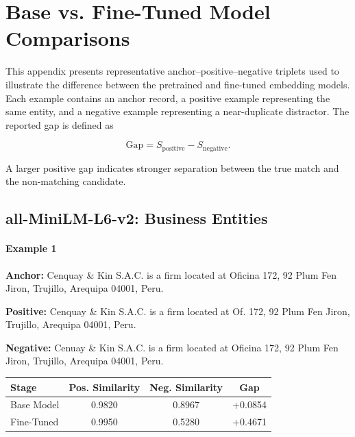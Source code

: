 \documentclass{article}
\begin{document}

\section{Base vs. Fine-Tuned Model Comparisons}
\label{sec:appendix-comparisons}

This appendix presents representative anchor--positive--negative triplets
used to illustrate the difference between the pretrained and fine-tuned
embedding models. Each example contains an anchor record, a positive
example representing the same entity, and a negative example representing
a near-duplicate distractor. The reported gap is defined as

\begin{equation}
\text{Gap}
=
S_{\text{positive}}
-
S_{\text{negative}}.
\end{equation}

A larger positive gap indicates stronger separation between the true match
and the non-matching candidate.


\subsection{all-MiniLM-L6-v2: Business Entities}

\paragraph{Example 1}

\textbf{Anchor:} Cenquay \& Kin S.A.C. is a firm located at Oficina 172, 92 Plum Fen Jiron, Trujillo, Arequipa 04001, Peru.

\textbf{Positive:} Cenquay \& Kin S.A.C. is a firm located at Of. 172, 92 Plum Fen Jiron, Trujillo, Arequipa 04001, Peru.

\textbf{Negative:} Cenuay \& Kin S.A.C. is a firm located at Oficina 172, 92 Plum Fen Jiron, Trujillo, Arequipa 04001, Peru.

\begin{center}
\small
\begin{tabular}{lccc}
\toprule
Stage & Pos. Similarity & Neg. Similarity & Gap \\
\midrule
Base Model & 0.9820 & 0.8967 & +0.0854 \\
Fine-Tuned & 0.9950 & 0.5280 & +0.4671 \\
\bottomrule
\end{tabular}
\end{center}
\end{document}

